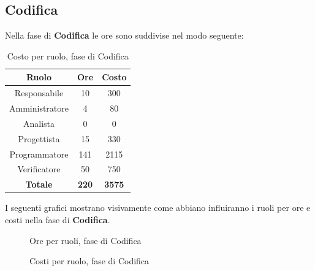 \subsection{Codifica}
Nella fase di \textbf{Codifica} le ore sono suddivise nel modo seguente:
\begin{table}[H]
	\centering
	\begin{tabular}{|c|c|c|}
		\hline
		\textbf{Ruolo} &
		\textbf{Ore} &
		\textbf{Costo} \\
		\hline
		Responsabile & 10 & 300 \\
		\hline
		Amministratore & 4 & 80 \\
		\hline
		Analista & 0 & 0\\
		\hline
		Progettista & 15 & 330 \\
		\hline
		Programmatore & 141 & 2115 \\
		\hline
		Verificatore & 50 & 750 \\
		\hline
		\textbf{Totale} & \textbf{220} & \textbf{3575} \\
		\hline
	\end{tabular}
	\caption{Costo per ruolo, fase di Codifica}
\end{table}

I seguenti grafici mostrano visivamente come abbiano influiranno i ruoli per ore e costi nella fase di \textbf{Codifica}.
\begin{figure}[H]
	\centering
	\caption{Ore per ruoli, fase di Codifica}
\end{figure}
\begin{figure}[H]
	\centering
	\caption{Costi per ruolo, fase di Codifica}
\end{figure}

